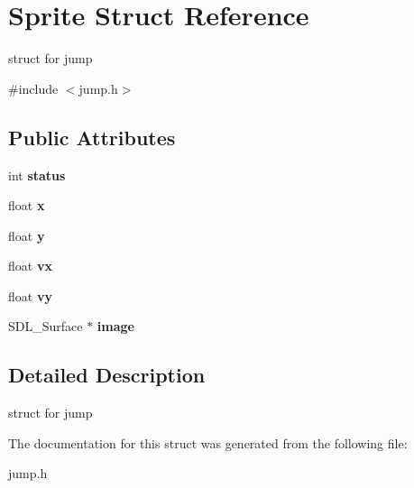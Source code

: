 \hypertarget{structSprite}{}\section{Sprite Struct Reference}
\label{structSprite}


struct for jump  




{\ttfamily \#include $<$jump.\+h$>$}

\subsection*{Public Attributes}
\begin{DoxyCompactItemize}
\item 
\mbox{\label{structSprite_a2500f95508a713c1ce20b2f09ec652da}} 
int {\bfseries status}
\item 
\mbox{\label{structSprite_ad5222d1d6d41088ab80cf7e096461799}} 
float {\bfseries x}
\item 
\mbox{\label{structSprite_ad09503279ec7c1b96bf67566a917e183}} 
float {\bfseries y}
\item 
\mbox{\label{structSprite_ae654b5c98a01bb8044609e792f8fab1b}} 
float {\bfseries vx}
\item 
\mbox{\label{structSprite_a37bb959256da6b84fed64a3787fc9840}} 
float {\bfseries vy}
\item 
\mbox{\label{structSprite_a80402c358e003c422aa75bec2b6d0099}} 
S\+D\+L\+\_\+\+Surface $\ast$ {\bfseries image}
\end{DoxyCompactItemize}


\subsection{Detailed Description}
struct for jump 

The documentation for this struct was generated from the following file\+:\begin{DoxyCompactItemize}
\item 
jump.\+h\end{DoxyCompactItemize}
